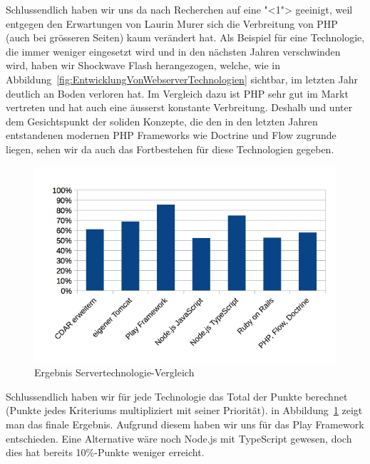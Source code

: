 			Schlussendlich haben wir uns da nach Recherchen auf eine "<1"> geeinigt, weil entgegen den Erwartungen von Laurin Murer sich die Verbreitung von PHP (auch bei grösseren Seiten) kaum verändert hat.
			Als Beispiel für eine Technologie, die immer weniger eingesetzt wird und in den nächsten Jahren verschwinden wird, haben wir Shockwave Flash herangezogen, welche, wie in Abbildung~\ref{fig:EntwicklungVonWebserverTechnologien} sichtbar, im letzten Jahr deutlich an Boden verloren hat.
			Im Vergleich dazu ist PHP sehr gut im Markt vertreten und hat auch eine äusserst konstante Verbreitung.
			Deshalb und unter dem Gesichtspunkt der soliden Konzepte, 
			die den in den letzten Jahren entstandenen modernen PHP Frameworks wie Doctrine und Flow zugrunde liegen, sehen wir da auch das Fortbestehen für diese Technologien gegeben.
			
			\begin{figure}[H]
				\begin{minipage}[b]{\linewidth}
					\includegraphics[width=\textwidth]{media/spreadsheets/ServertechnologieVergleichVergleichDerTechnologienDiagramm.png}
					\centering
					\caption{Ergebnis Servertechnologie-Vergleich}
					\label{fig:ErgebnisServertechnologieVergleich}
				\end{minipage}
			\end{figure}
			
			Schlussendlich haben wir für jede Technologie das Total der Punkte berechnet (Punkte jedes Kriteriums multipliziert mit seiner Priorität). in Abbildung~\ref{fig:ErgebnisServertechnologieVergleich} zeigt man das finale Ergebnis. Aufgrund diesem haben wir uns für das Play Framework entschieden. Eine Alternative wäre noch Node.js mit TypeScript gewesen, doch dies hat bereits 10\%-Punkte weniger erreicht.
			
